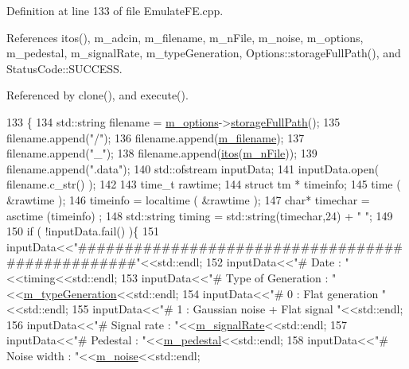 Definition at line 133 of file Emulate\+F\+E.\+cpp.



References itos(), m\+\_\+adcin, m\+\_\+filename, m\+\_\+n\+File, m\+\_\+noise, m\+\_\+options, m\+\_\+pedestal, m\+\_\+signal\+Rate, m\+\_\+type\+Generation, Options\+::storage\+Full\+Path(), and Status\+Code\+::\+S\+U\+C\+C\+E\+SS.



Referenced by clone(), and execute().


\begin{DoxyCode}
133                                     \{
134   std::string filename = \hyperlink{classEmulateFE_a2f2da7d4b2164c47673a6ecc6dcef1ea}{m\_options}->\hyperlink{classOptions_aa5fe6b85088f3012226869480790a383}{storageFullPath}();
135   filename.append(\textcolor{stringliteral}{"/"});
136   filename.append(\hyperlink{classEmulateFE_a103fedea9eb5d3963573f9120cb81a68}{m\_filename});
137   filename.append(\textcolor{stringliteral}{"\_"});
138   filename.append(\hyperlink{Tools_8h_af330027dbdafb9a30768b3613c553e60}{itos}(\hyperlink{classEmulateFE_a04ed956f5992c36590dd5a6abc19de2c}{m\_nFile}));
139   filename.append(\textcolor{stringliteral}{".data"});
140   std::ofstream inputData;
141   inputData.open( filename.c\_str() );
142 
143   time\_t rawtime;
144   \textcolor{keyword}{struct }tm * timeinfo;  
145   time ( &rawtime );
146   timeinfo = localtime ( &rawtime );
147   \textcolor{keywordtype}{char}* timechar =  asctime (timeinfo) ;
148   std::string timing = std::string(timechar,24) + \textcolor{stringliteral}{" "};
149 
150   \textcolor{keywordflow}{if} ( !inputData.fail() )\{
151     inputData<<\textcolor{stringliteral}{"#################################################"}<<std::endl;
152     inputData<<\textcolor{stringliteral}{"# Date : "}<<timing<<std::endl;
153     inputData<<\textcolor{stringliteral}{"# Type of Generation : "}<<\hyperlink{classEmulateFE_aa8bd0aa42cc5f3d52930408807b3067c}{m\_typeGeneration}<<std::endl;
154     inputData<<\textcolor{stringliteral}{"#      0 : Flat generation "}<<std::endl;
155     inputData<<\textcolor{stringliteral}{"#      1 : Gaussian noise + Flat signal "}<<std::endl;
156     inputData<<\textcolor{stringliteral}{"#                 Signal rate : "}<<\hyperlink{classEmulateFE_a7aeff9e62f850ca6d7ee27dce02a060b}{m\_signalRate}<<std::endl;
157     inputData<<\textcolor{stringliteral}{"#                 Pedestal    : "}<<\hyperlink{classEmulateFE_a033996ce759c11305395ac865a6c074a}{m\_pedestal}<<std::endl;
158     inputData<<\textcolor{stringliteral}{"#                 Noise width : "}<<\hyperlink{classEmulateFE_a74f8720a1da5806fad3811339ef9b98f}{m\_noise}<<std::endl;    

\end{DoxyCode}
